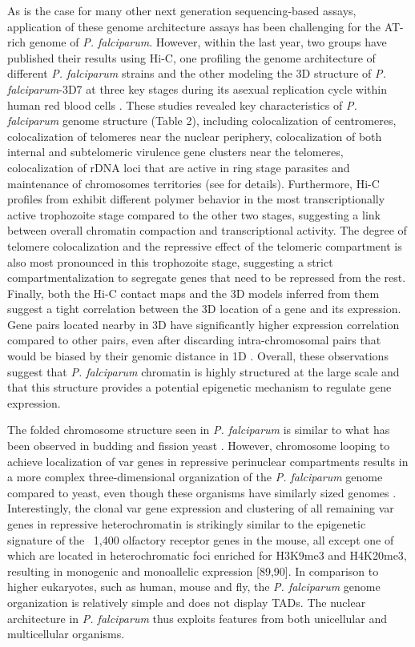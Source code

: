 As is the case for many other next generation sequencing-based assays,
application of these genome architecture assays has been challenging for the
AT-rich genome of \textit{P. falciparum}. However, within the last year, two groups
have published their results using Hi-C, one profiling the genome architecture
of different \textit{P. falciparum} strains \citep{lemieux:genome-wide} 
and the other modeling the 3D
structure of \textit{P. falciparum}-3D7 at three key stages during its asexual
replication cycle within human red blood cells \citep{ay:three-dimensional}.
These studies revealed
key characteristics of \textit{P. falciparum} genome structure (Table 2), including
colocalization of centromeres, colocalization of telomeres near the nuclear
periphery, colocalization of both internal and subtelomeric virulence gene
clusters near the telomeres, colocalization of rDNA loci that are active in
ring stage parasites and maintenance of chromosomes territories (see
\citet{ay:three-dimensional} for details). Furthermore, Hi-C profiles from
\citet{ay:three-dimensional} exhibit different
polymer behavior in the most transcriptionally active trophozoite stage
compared to the other two stages, suggesting a link between overall chromatin
compaction and transcriptional activity. The degree of telomere colocalization
and the repressive effect of the telomeric compartment is also most pronounced
in this trophozoite stage, suggesting a strict compartmentalization to
segregate genes that need to be repressed from the rest. Finally, both the
Hi-C contact maps and the 3D models inferred from them suggest a tight
correlation between the 3D location of a gene and its expression. Gene pairs
located nearby in 3D have significantly higher expression correlation compared
to other pairs, even after discarding intra-chromosomal pairs that would be
biased by their genomic distance in 1D \citep{ay:three-dimensional}. Overall, these observations
suggest that \textit{P. falciparum} chromatin is highly structured at the large scale
and that this structure provides a potential epigenetic mechanism to regulate
gene expression.

The folded chromosome structure seen in \textit{P. falciparum} is similar to what has
been observed in budding and fission yeast \citep{duan:three,
tanizawa:mapping}. However, chromosome
looping to achieve localization of var genes in repressive perinuclear
compartments results in a more complex three-dimensional organization of the
\textit{P. falciparum} genome compared to yeast, even though these organisms have
similarly sized genomes \citep{ay:three-dimensional}.
Interestingly, the clonal var gene expression
and clustering of all remaining var genes in repressive heterochromatin is
strikingly similar to the epigenetic signature of the ~1,400 olfactory
receptor genes in the mouse, all except one of which are located in
heterochromatic foci enriched for H3K9me3 and H4K20me3, resulting in monogenic
and monoallelic expression [89,90]. In comparison to higher eukaryotes, such
as human, mouse and fly, the \textit{P. falciparum} genome organization is relatively
simple and does not display TADs. The nuclear architecture in \textit{P.
falciparum}
thus exploits features from both unicellular and multicellular organisms.

